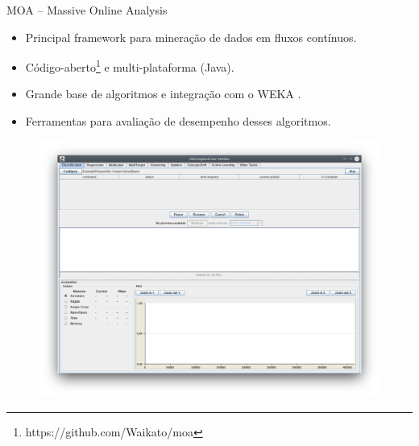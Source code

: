 \documentclass[10pt]{beamer}
\begin{document}
\begin{frame}{MOA – Massive Online Analysis}
    \begin{itemize}
        \item Principal framework para mineração de dados em fluxos contínuos.
        \item Código-aberto\footnote{https://github.com/Waikato/moa} e multi-plataforma (Java).
        \item Grande base de algoritmos e integração com o WEKA \cite{Hall:2009:WDM:1656274.1656278}.
        \item Ferramentas para avaliação de desempenho desses algoritmos.
    \end{itemize}

    \begin{figure}[H]
        \begin{center}
            \includegraphics[scale=0.2]{imagens/moa.png}
        \end{center}
    \end{figure}
\end{frame}
\end{document}

